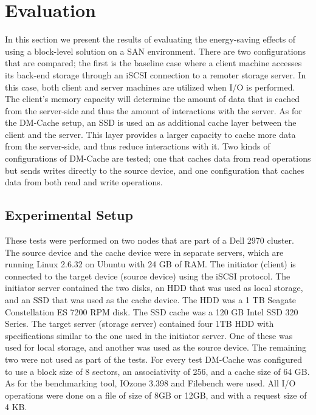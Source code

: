 \section{Evaluation}
\label{sec:evaluation}

In this section we present the results of evaluating the energy-saving effects
of using a block-level solution on a SAN environment. There are two
configurations that are compared; the first is the baseline case where a client
machine accesses its back-end storage through an iSCSI connection to a remoter
storage server. In this case, both client and server machines are utilized when
I/O is performed. The client's memory capacity will determine the amount of data
that is cached from the server-side and thus the amount of interactions with the
server. As for the DM-Cache setup, an SSD is used an as additional cache layer
between the client and the server. This layer provides a larger capacity to
cache more data from the server-side, and thus reduce interactions with it. Two
kinds of configurations of DM-Cache are tested; one that caches data from read
operations but sends writes directly to the source device, and one configuration
that caches data from both read and write operations.

\subsection{Experimental Setup}

These tests were performed on two nodes that are part of a Dell 2970
cluster. The source device and the cache device were in separate servers, which
are running Linux 2.6.32 on Ubuntu with 24 GB of RAM.  The initiator (client) is
connected to the target device (source device) using the iSCSI protocol. The
initiator server contained the two disks, an HDD that was used as local storage,
and an SSD that was used as the cache device. The HDD was a 1 TB Seagate
Constellation ES 7200 RPM disk. The SSD cache was a 120 GB Intel SSD 320
Series. The target server (storage server) contained four 1TB HDD with
specifications similar to the one used in the initiator server. One of these was
used for local storage, and another was used as the source device. The remaining
two were not used as part of the tests. For every test DM-Cache was configured
to use a block size of 8 sectors, an associativity of 256, and a cache size of
64 GB. As for the benchmarking tool, IOzone 3.398 and Filebench were used. All
I/O operations were done on a file of size of 8GB or 12GB, and with a request
size of 4 KB.

